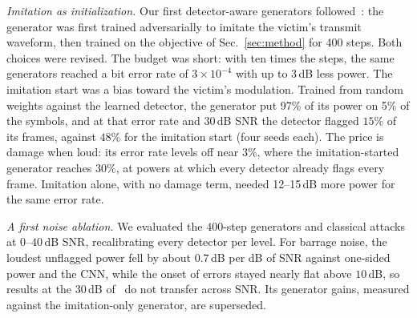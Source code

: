\textit{Imitation as initialization.}
Our first detector-aware generators followed~\cite{11184988}: the generator was first trained adversarially to imitate the victim's transmit waveform, then trained on the objective of Sec.~\ref{sec:method} for 400 steps.
Both choices were revised.
The budget was short: with ten times the steps, the same generators reached a bit error rate of $3\times10^{-4}$ with up to 3\,dB less power.
The imitation start was a bias toward the victim's modulation.
Trained from random weights against the learned detector, the generator put 97\% of its power on 5\% of the symbols, and at that error rate and 30\,dB SNR the detector flagged $15\%$ of its frames, against $48\%$ for the imitation start (four seeds each).
The price is damage when loud: its error rate levels off near $3\%$, where the imitation-started generator reaches $30\%$, at powers at which every detector already flags every frame.
Imitation alone, with no damage term, needed 12--15\,dB more power for the same error rate.

\textit{A first noise ablation.}
We evaluated the $400$-step generators and classical attacks at $0$--$40$\,dB SNR, recalibrating every detector per level.
For barrage noise, the loudest unflagged power fell by about $0.7$\,dB per dB of SNR against one-sided power and the CNN, while the onset of errors stayed nearly flat above $10$\,dB, so results at the $30$\,dB of~\cite{11184988} do not transfer across SNR.
Its generator gains, measured against the imitation-only generator, are superseded.

